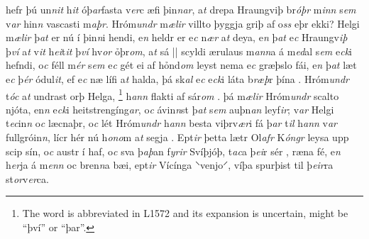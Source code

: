 hefr þú  un\textit{n}\textit{it} h\textit{it}
 óþ\textit{ar}fasta   v\textit{er}c æfi
þin\textit{n}\textit{ar}, a\textit{t} drepa Hraungviþ br\textit{óþr} m\textit{inn} s\textit{em} v\textit{ar} hin\textit{n} vascasti  m\textit{aþr}.
Hróm\textit{undr} m\textit{ælir} villto þyggja griþ af o\textit{ss} eþr ekki? 
Helgi m\textit{ælir} þ\textit{at} er nú í þin\textit{n}i hendi, e\textit{n} heldr er e\textit{c} n\textit{ær} a\textit{t} deya, e\textit{n} þ\textit{at} e\textit{c}  Hraungv\textit{iþ} 
þ\textit{ví} a\textit{t} v\textit{it}  h\textit{ei}t\textit{it} þ\textit{ví} hv\textit{or} ỏþr\textit{om}, a\textit{t} sá 
||
 scyldi ærulaus  
m\textit{ann}a á m\textit{ed}al s\textit{em} e\textit{ck}i hefndi,
o\textit{c} féll m\textit{ér} 
 s\textit{em} e\textit{c} gét ei af hỏnd\textit{om} leyst nema e\textit{c}
græþslo  fái, e\textit{n} þ\textit{at} læt e\textit{c} þ\textit{ér}  ódul\textit{it},  ef e\textit{c} næ lífi a\textit{t} halda, þá sk\textit{al} e\textit{c} e\textit{ck}i láta b\textit{ræþ}r þína  . 
Hróm\textit{undr} t\textit{óc} a\textit{t}  undrast  orþ Helga,  
\footnote{
	The word is abbreviated in L1572 and its expansion is uncertain, might be \enquote{því} or \enquote{þar}.} 
h\textit{ann}  flakti  
 af sár\textit{om} .  
þá m\textit{ælir} Hróm\textit{undr}  scalto njóta, 
en\textit{n} e\textit{ck}i heitstrengíng\textit{ar}, o\textit{c}  ávin\textit{n}st  þ\textit{at}
s\textit{em}  auþn\textit{an} leyf\textit{ir}; 
v\textit{ar} Helgi
t\textit{ec}in\textit{n} o\textit{c} læcnaþr, o\textit{c} lét Hróm\textit{undr} h\textit{ann}  besta  viþrv\textit{ær}i  fá þ\textit{ar} t\textit{il}  h\textit{ann} v\textit{ar} fullgróin\textit{n}, 
lícr hér nú   h\textit{ono}m a\textit{t} segja  . 
Ept\textit{ir}   þetta 
lætr Ol\textit{afr} K\textit{óngr} leysa upp
scip sín, o\textit{c}  austr í haf, o\textit{c} sva þ\textit{aþ}an f\textit{yrir} Svíþjóþ, t\textit{ac}a þ\textit{ei}r sér  , 
ræna fé, e\textit{n}  h\textit{er}ja  á m\textit{enn} oc  bren\textit{n}a bæi, ept\textit{ir} Vícínga  ⸌venjo⸍,  víþa spurþist  til  þ\textit{eir}ra st\textit{or}v\textit{er}ca. 
\pend \endnumbering  

